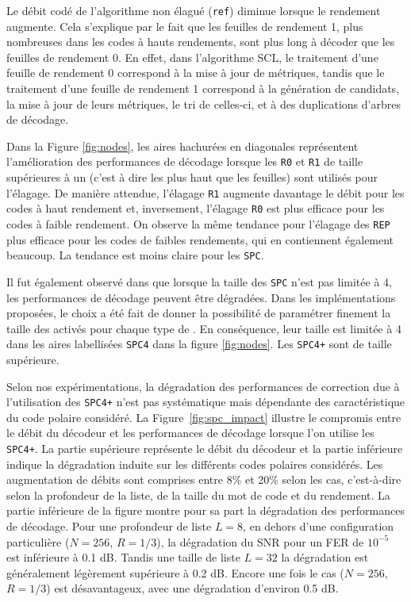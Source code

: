 Le débit codé de l'algorithme non élagué (\texttt{ref}) diminue lorsque le rendement augmente. Cela s'explique par le fait que les feuilles de rendement 1, plus nombreuses dans les codes à hauts rendements, sont plus long à décoder que les feuilles de rendement 0. En effet, dans l'algorithme SCL, le traitement d'une feuille de rendement 0 correspond à la mise à jour de métriques, tandis que le traitement d'une feuille de rendement 1 correspond à la génération de candidats, la mise à jour de leurs métriques, le tri de celles-ci, et à des duplications d'arbres de décodage.

Dans la Figure \ref{fig:nodes}, les aires hachurées en diagonales représentent l'amélioration des performances de décodage lorsque les \noeuds \texttt{R0} et \texttt{R1} de taille supérieures à un (c'est à dire les \noeuds plus haut que les feuilles) sont utilisés pour l'élagage. De manière attendue, l'élagage \texttt{R1} augmente davantage le débit pour les codes à haut rendement et, inversement, l'élagage \texttt{R0} est plus efficace pour les codes à faible rendement. On observe la même tendance pour l'élagage des \noeuds \texttt{REP} plus efficace pour les codes de faibles rendements, qui en contiennent également beaucoup. La tendance est moins claire pour les \noeuds \texttt{SPC}.

Il fut également observé dans \cite{sarkis_fast_2014} que lorsque la taille des \noeuds \texttt{SPC} n'est pas limitée à 4, les performances de décodage peuvent être dégradées. Dans les implémentations proposées, le choix a été fait de donner la possibilité de paramétrer finement la taille des \noeuds activés pour chaque type de \noeuds. En conséquence, leur taille est limitée à 4 dans les aires labellisées \texttt{SPC4} dans la figure \ref{fig:nodes}. Les \noeuds \texttt{SPC4+} sont de taille supérieure.

Selon nos expérimentations, la dégradation des performances de correction due à l'utilisation des \noeuds \texttt{SPC4+} n'est pas systématique mais dépendante des caractéristique du code polaire considéré. La Figure~\ref{fig:spc_impact} illustre le compromis entre le débit du décodeur et les performances de décodage lorsque l'on utilise les \noeuds \texttt{SPC4+}. La partie supérieure représente le débit du décodeur et la partie inférieure indique la dégradation induite sur les différents codes polaires considérés. Les augmentation de débits sont comprises entre 8\% et 20\% selon les cas, c'est-à-dire selon la profondeur de la liste, de la taille du mot de code et du rendement. La partie inférieure de la figure montre pour sa part la dégradation des performances de décodage. Pour une profondeur de liste $L=8$, en dehors d'une configuration particulière ($N=256$, $R=1/3$), la dégradation du SNR pour un FER de $10^{-5}$ est inférieure à 0.1 dB. Tandis une taille de liste $L=32$ la dégradation est généralement légèrement supérieure à 0.2 dB. Encore une fois le cas ($N=256$, $R=1/3$) est désavantageux, avec une dégradation d'environ 0.5 dB.

